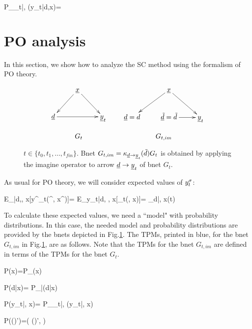 \beq\color{blue}
P_{\rvy_t|\rvd, \rvx}(y_t|d,x)=
\eeq

\section{PO analysis}
In this section,
we show how
to analyze the
SC method
using the formalism of PO theory.



\begin{figure}[h!]
$$
\begin{array}{ccccc}
\xymatrix{
&\rvx\ar[dl]\ar[dr]
\\
\rvd\ar[rr]&&\rvy_t
}
&&
\xymatrix{
&\rvx\ar[dl]\ar[dr]
\\
\rvd=d&\rvtd=\td\ar[r]&\rvy_t
}
\\
\\
G_t&&G_{t, im}
\end{array}
$$
\caption{$t\in \{t_0, t_1, \ldots, 
t_{fin}\}$.
Bnet 
$G_{t, im}= \kappa_{{\underline{d}}\rightarrow{\underline{y}}_t}
({\tilde{d}})G_t$
is obtained by applying 
the imagine operator to arrow 
${\underline{d}}\rightarrow{\underline{y}}_t$
of bnet $G_t$.}
\label{fig-syn-con-G-im}
\end{figure}

As usual for PO theory,
we will consider
expected values of $y^\sigma_t$:


\beq
E_{\s|d,\td, x}[y^\s_t(\td^\s, x^\s)]=
 E_{y_t|d, \td, x}[\rvy_t(\td, x)]=
\caly_{d|\td, x}(t)
\eeq

To calculate these
expected values, we need a ``model"
with probability 
distributions.
In this case,
the needed model and probability
distributions are
provided by the
bnets depicted in Fig.\ref{fig-syn-con-G-im}.
The TPMs,
printed in blue,
for the 
 bnet
$G_{t, im}$
in Fig.\ref{fig-syn-con-G-im},
are as follows.
Note
that the
TPMs for the bnet $G_{t, im}$
are defined in 
terms
of the TPMs for the bnet $G_t$.



\beq\color{blue}
P(x)=P_{\rvx}(x)
\eeq

\beq\color{blue}
P(d|x)= 
P_{\rvd|\rvx}(d|x)
\eeq
 
\beq\color{blue}
P(y_t|\td, x)=
P_{\rvy_t|\rvd, \rvx}
(y_t|\td, x)
\eeq

\beq\color{blue}
P((\td)')=\delta(
(\td)', \td)
\eeq

